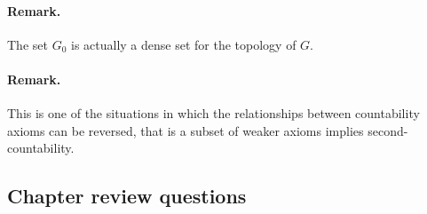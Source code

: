 \paragraph{Remark.} The set \( G_0 \) is actually a dense set for the topology of \( G \).

\paragraph{Remark.} This is one of the situations in which the relationships between countability axioms can be reversed, that is a subset of weaker axioms implies second-countability.

\subsection{Chapter review questions}


